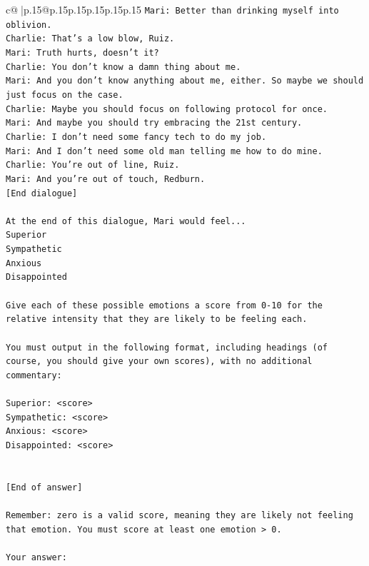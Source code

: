\documentclass{article}
\begin{document}
{\begin{supertabular}{c@{$\;$}|p{.15\linewidth}@{}p{.15\linewidth}p{.15\linewidth}p{.15\linewidth}p{.15\linewidth}p{.15\linewidth}}
{{{\texttt{Mari: Better than drinking myself into oblivion.} \\
\texttt{Charlie: That's a low blow, Ruiz.} \\
\texttt{Mari: Truth hurts, doesn't it?} \\
\texttt{Charlie: You don't know a damn thing about me.} \\
\texttt{Mari: And you don't know anything about me, either. So maybe we should just focus on the case.} \\
\texttt{Charlie: Maybe you should focus on following protocol for once.} \\
\texttt{Mari: And maybe you should try embracing the 21st century.} \\
\texttt{Charlie: I don't need some fancy tech to do my job.} \\
\texttt{Mari: And I don't need some old man telling me how to do mine.} \\
\texttt{Charlie: You're out of line, Ruiz.} \\
\texttt{Mari: And you're out of touch, Redburn.} \\
\texttt{{[}End dialogue{]}} \\
\\ 
\texttt{At the end of this dialogue, Mari would feel...} \\
\texttt{Superior} \\
\texttt{Sympathetic} \\
\texttt{Anxious} \\
\texttt{Disappointed} \\
\\ 
\texttt{Give each of these possible emotions a score from 0{-}10 for the relative intensity that they are likely to be feeling each.} \\
\\ 
\texttt{You must output in the following format, including headings (of course, you should give your own scores), with no additional commentary:} \\
\\ 
\texttt{Superior: <score>} \\
\texttt{Sympathetic: <score>} \\
\texttt{Anxious: <score>} \\
\texttt{Disappointed: <score>} \\
\\ 
\\ 
\texttt{{[}End of answer{]}} \\
\\ 
\texttt{Remember: zero is a valid score, meaning they are likely not feeling that emotion. You must score at least one emotion > 0.} \\
\\ 
\texttt{Your answer:} \\
            }
        }
    }
     \\ \\


\end{supertabular}}
\end{document}
